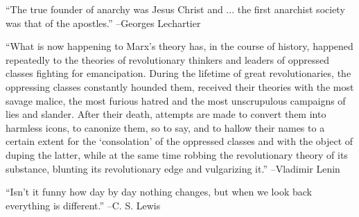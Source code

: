\documentclass{article}%
\begin{document}
\linebreak%
\vspace{1mm}%
\begin{minipage}{\textwidth}%
\flushleft%
“The true founder of anarchy was Jesus Christ and ... the first anarchist society was that of the apostles.”%
\linebreak%
\vspace{1mm}%
–Georges Lechartier%
\linebreak%
\vspace{1mm}%
\end{minipage}%
\linebreak%
\vspace{1mm}%
\begin{minipage}{\textwidth}%
\flushleft%
“What is now happening to Marx's theory has, in the course of history, happened repeatedly to the theories of revolutionary thinkers and leaders of oppressed classes fighting for emancipation. During the lifetime of great revolutionaries, the oppressing classes constantly hounded them, received their theories with the most savage malice, the most furious hatred and the most unscrupulous campaigns of lies and slander. After their death, attempts are made to convert them into harmless icons, to canonize them, so to say, and to hallow their names to a certain extent for the ‘consolation’ of the oppressed classes and with the object of duping the latter, while at the same time robbing the revolutionary theory of its substance, blunting its revolutionary edge and vulgarizing it.”%
\linebreak%
\vspace{1mm}%
–Vladimir Lenin%
\linebreak%
\vspace{1mm}%
\end{minipage}%
\linebreak%
\vspace{1mm}%
\begin{minipage}{\textwidth}%
\flushleft%
“Isn't it funny how day by day nothing changes, but when we look back everything is different.”%
\linebreak%
\vspace{1mm}%
–C. S. Lewis%
\linebreak%
\vspace{1mm}%
\end{minipage}%
\linebreak%
\vspace{1mm}%
\end{document}
